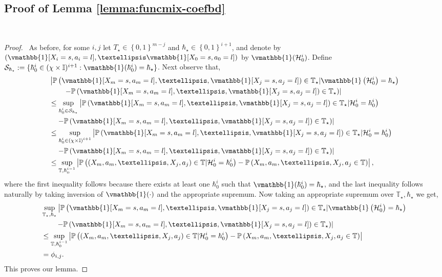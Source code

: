 \documentclass[opre,sglanonrev]{informs4}
\numberwithin{equation}{section}
\newcommand{\lp}{\left(}
\newcommand{\rp}{\right)}
\newcommand{\lc}{\left\{}
\newcommand{\rc}{\right\}}
\newcommand{\History}{\mathcal{H}}
\newcommand{\history}{\hbar}
\newcommand{\Ibb}{\mathbb{I}}
\newcommand{\Pbb}{\mathbb{P}}
\newcommand{\Tbb}{\mathbb{T}}
\newcommand{\Scal}{\mathcal{S}}
\newcommand{\prob}{\Pbb}
\newcommand{\indicator}{\vmathbb{1}}
\begin{document}
\begin{APPENDICES}
\subsection{Proof of Lemma \ref{lemma:funcmix-coefbd}}~\label{sec:prf-fmxcfd}
\begin{proof}\ 
As before, for some $i,j$ let $T_\star\in\lc0,1\rc^{m-j}$ and $\history_\star\in\lc0,1\rc^{i+1}$, and denote by $\lp\indicator[X_i=s,a_i=l],\dots \indicator[X_0=s,a_0=l]\rp$ by $\indicator(\History_0^i)$.
Define $\Scal_{\history_\star}:=\{\history_0^i\in (\chi\times\Ibb)^{i+1}:\indicator(\history_0^i)=\history_\star\}$.
Next observe that,
\begin{align*}
    & \left|\prob\left(\indicator[X_m=s,a_m=l],\dots, \indicator[X_j=s,a_j=l])\in \mathbb{T}_\star|\indicator\lp\History_0^{i}\rp=\history_\star\right)\right.\\
    & \qquad \left.-\prob\lp\indicator[X_m=s,a_m=l],\dots, \indicator[X_j=s,a_j=l])\in \mathbb{T}_\star\rp\right|\\
    & \leq \sup_{\substack{\history_0^{i}\in \Scal_{\history_\star}}} \left|\prob\left(\indicator[X_m=s,a_m=l],\dots, \indicator[X_j=s,a_j=l])\in\right. \mathbb{T}_\star|\History_0^{i}=\history_0^{i}\right)\\
    & \quad \left.-\prob\left(\indicator[X_m=s,a_m=l],\dots, \indicator[X_j=s,a_j=l])\in \mathbb{T}_\star\right)\right|\\
    &\leq \sup_{\substack{\history_0^{i}\in (\chi\times\Ibb)^{i+1}}} \left|\prob\left(\indicator[X_m=s,a_m=l],\dots, \indicator[X_j=s,a_j=l])\in\right. \mathbb{T}_\star|\History_0^{i}=\history_0^{i}\right)\\
    & \quad \left.-\prob\left(\indicator[X_m=s,a_m=l],\dots, \indicator[X_j=s,a_j=l])\in \mathbb{T}_\star\right)\right|\\
    & \leq \sup_{\substack{\Tbb,\history_0^{i-1}}}\left|\prob\left((X_m,a_m,\dots, X_j,a_j)\in \mathbb{T}|\History_0^{i}=\history_0^{i}\right)-\prob\left(X_m,a_m,\dots,X_j,a_j\in\mathbb{T}\right)\right|,
\end{align*}
where the first inequality follows because there exists at least one $\history_0^{i}$ such that $\indicator(\history_0^{i})=\history_\star$, and the last inequality follows naturally by taking inversion of $\indicator(\cdot)$ and the appropriate supremum. 
Now taking an appropriate supremum over $\Tbb_\star,\history_\star$ we get,
\begin{align*}
    & \sup_{\substack{\Tbb_\star,\history_\star}}\left|\prob\left(\indicator[X_m=s,a_m=l],\dots, \indicator[X_j=s,a_j=l])\in \mathbb{T}_\star|\indicator\lp\History_0^{i}\rp=\history_\star\right)\right.\\
    & \qquad \left.-\prob\lp\indicator[X_m=s,a_m=l],\dots, \indicator[X_j=s,a_j=l])\in \mathbb{T}_\star\rp\right|\\
    & \leq \sup_{\substack{\Tbb,\history_0^{i-1}}}\left|\prob\left((X_m,a_m,\dots, X_j,a_j)\in \mathbb{T}|\History_0^{i}=\history_0^{i}\right)-\prob\left(X_m,a_m,\dots,X_j,a_j\in\mathbb{T}\right)\right|\\
    & =\phi_{i,j}.
\end{align*}
This proves our lemma.
\end{proof}

\end{APPENDICES}
\end{document}
